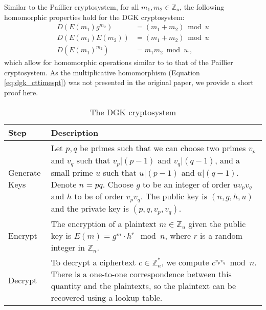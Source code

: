 Similar to the Paillier cryptosystem, for all $m_1,m_2 \in \mathbb{Z}_u$, the following homomorphic properties hold for the DGK cryptosystem:
\begin{align}
    D(E(m_1)g^{m_2}) &=(m_1+m_2)\bmod u \label{eq:dgk_ctpluspt}\\
    D(E(m_1)E(m_2)) &=(m_1+m_2)\bmod u \label{eq:dgk_ctplusct}\\
    D(E(m_1)^{m_2}) &= m_1m_2\bmod u. \label{eq:dgk_cttimespt},
\end{align}
which allow for homomorphic operations similar to to that of the Paillier cryptosystem.
As the multiplicative homomorphism (Equation \ref{eq:dgk_cttimespt}) was not presented in the original paper, we provide a short proof here.
\begin{table}[ht]
	\caption{The DGK cryptosystem}
	\label{tab:dgk_summary}
    \begin{tabular}{
        p{}
        p{}}
		\toprule
		Step & Description\\
        \midrule
            Generate \newline Keys &
            Let $p,q$ be primes such that we can choose two primes $v_p$ and $v_q$ such that $v_p | (p-1)$ and $v_q | (q-1)$, and a small prime $u$ such that $u | (p-1)$ and $u | (q-1)$. \newline
            Denote $n = pq$. \newline
            Choose $g$ to be an integer of order $uv_pv_q$ and $h$ to be of order $v_pv_q$.\newline
            The public key is $(n,g,h,u)$ and the private key is $(p,q,v_p,v_q)$.
            \\
            Encrypt &
            The encryption of a plaintext $m \in \mathbb{Z}_u$ given the public key is $E(m) = g^m \cdot h^r \mod{n}$, where $r$ is a random integer in $\mathbb{Z}_n$.
            \\
            Decrypt &
            To decrypt a ciphertext $c \in \mathbb{Z}_n^\ast$, we compute $c^{v_pv_q} \bmod n$. There is a one-to-one correspondence between this quantity and the plaintexts, so the plaintext can be recovered using a lookup table.
            \\
	    \bottomrule
    \end{tabular}
\end{table}


